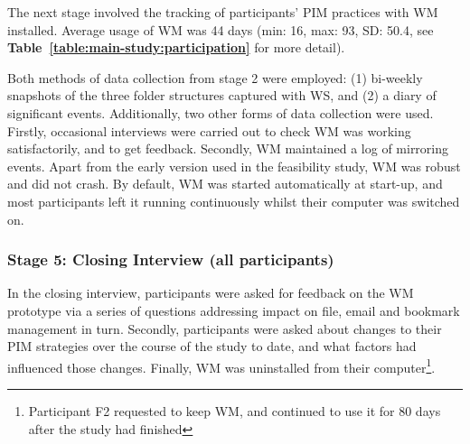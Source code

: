 The next stage involved the tracking of participants' PIM practices with WM installed. Average usage of WM was 44 days (min: 16, max: 93, SD: 50.4, see \textbf{Table~\ref{table:main-study:participation}} for more detail).

Both methods of data collection from stage 2 were employed: (1) bi-weekly snapshots of the three folder structures captured with WS, and (2) a diary of significant events.  Additionally, two other forms of data collection were used.  Firstly, occasional interviews were carried out to check WM was working satisfactorily, and to get feedback. Secondly, WM maintained a log of mirroring events.  %
Apart from the early version used in the feasibility study, WM was robust and did not crash.  By default, WM was started automatically at start-up, and most participants left it running continuously whilst their computer was switched on.  %



\subsubsection{Stage 5: Closing Interview (all participants)}

In the closing interview, participants were asked for feedback on the WM prototype via a series of questions addressing impact on file, email and bookmark management in turn.  %
Secondly, participants were asked about changes to their PIM strategies over the course of the study to date, and what factors had influenced those changes.  Finally, WM was uninstalled from their computer\footnote{Participant F2 requested to keep WM, and continued to use it for 80 days after the study had finished}.  %



